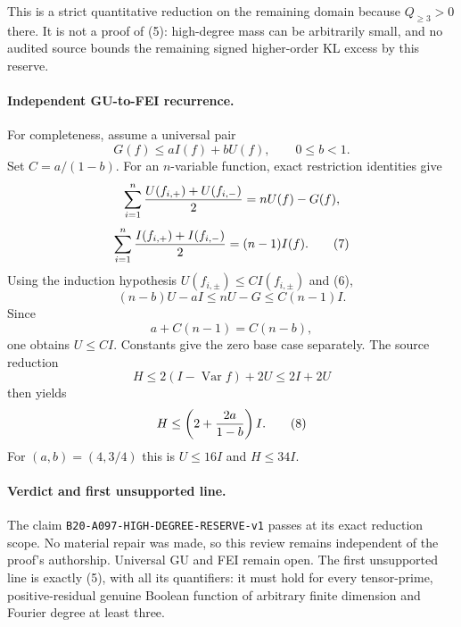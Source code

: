 This is a strict quantitative reduction on the remaining domain because
$Q_{\ge3}>0$ there.  It is not a proof of (5): high-degree mass can be
arbitrarily small, and no audited source bounds the remaining signed
higher-order KL excess by this reserve.

\paragraph{Independent GU-to-FEI recurrence.}
For completeness, assume a universal pair
\[
 G(f)\le aI(f)+bU(f),\qquad 0\le b<1.                 \tag{6}
\]
Set $C=a/(1-b)$.  For an $n$-variable function, exact restriction
identities give
\[
 \sum_{i=1}^n {U(f_{i,+})+U(f_{i,-})\over2}=nU(f)-G(f),
\]
\[
 \sum_{i=1}^n {I(f_{i,+})+I(f_{i,-})\over2}=(n-1)I(f). \tag{7}
\]
Using the induction hypothesis $U(f_{i,\pm})\le CI(f_{i,\pm})$ and
(6),
\[
 (n-b)U-aI\le nU-G\le C(n-1)I.
\]
Since
\[
 a+C(n-1)=C(n-b),
\]
one obtains $U\le CI$.  Constants give the zero base case separately.
The source reduction
\[
 H\le2(I-\operatorname{Var}f)+2U\le2I+2U
\]
then yields
\[
 H\le\left(2+{2a\over1-b}\right)I.                  \tag{8}
\]
For $(a,b)=(4,3/4)$ this is $U\le16I$ and $H\le34I$.

\paragraph{Verdict and first unsupported line.}
The claim \texttt{B20-A097-HIGH-DEGREE-RESERVE-v1} passes at its exact
reduction scope.  No material repair was made, so this review remains
independent of the proof's authorship.  Universal GU and FEI remain open.
The first unsupported line is exactly (5), with all its quantifiers:
it must hold for every tensor-prime, positive-residual genuine Boolean
function of arbitrary finite dimension and Fourier degree at least three.
